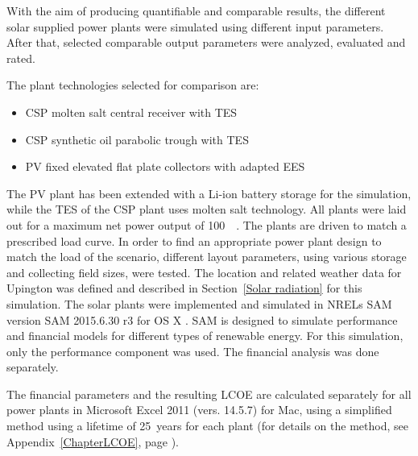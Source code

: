 With the aim of producing quantifiable and comparable results, the different solar supplied power plants were simulated using different input parameters. After that, selected comparable output parameters were analyzed, evaluated and rated.

The plant technologies selected for comparison are:
\begin{itemize}
\item \ac{CSP} molten salt central receiver with \acl{TES}
\item \ac{CSP} synthetic oil parabolic trough with \acl{TES}
\item \ac{PV} fixed elevated flat plate collectors with adapted \acl{EES}
\end{itemize}
The \ac{PV} plant has been extended with a \ac{Li-ion} battery storage for the simulation, while the \ac{TES} of the \ac{CSP} plant uses molten salt technology. All plants were laid out for a maximum net power output of \SI{100}{\mega\wattel}. The plants are driven to match a prescribed load curve. In order to find an appropriate power plant design to match the load of the scenario, different layout parameters, using various storage and collecting field sizes, were tested. The location and related weather data for Upington was defined and described in Section~\ref{Solar radiation} for this simulation. The solar plants were implemented and simulated in \acp{NREL} \acf{SAM} version SAM 2015.6.30 r3 for OS X \cite{NREL2015}. \ac{SAM} is designed to simulate performance and financial models for different types of renewable energy. For this simulation, only the performance component was used. The financial analysis was done separately. 

The financial parameters and the resulting \ac{LCOE} are calculated separately for all power plants in Microsoft Excel 2011 (vers. 14.5.7) for Mac, using a simplified method using a lifetime of \SI{25}{years} for each plant (for details on the method, see Appendix~\ref{ChapterLCOE}, page \pageref{ChapterLCOE}).
